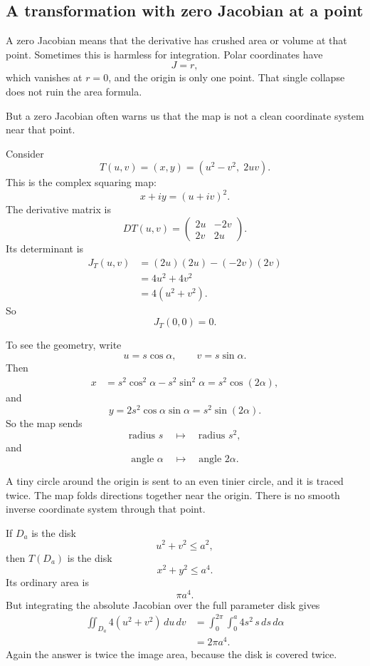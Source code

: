 \subsection{A transformation with zero Jacobian at a point}

A zero Jacobian means that the derivative has crushed area or volume at that point.
Sometimes this is harmless for integration.  Polar coordinates have
\[
    J=r,
\]
which vanishes at \(r=0\), and the origin is only one point.  That single collapse does
not ruin the area formula.

But a zero Jacobian often warns us that the map is not a clean coordinate system near
that point.

Consider
\[
    T(u,v)=(x,y)=(u^2-v^2,\;2uv).
\]
This is the complex squaring map:
\[
    x+iy=(u+iv)^2.
\]
The derivative matrix is
\[
    DT(u,v)=
    \begin{pmatrix}
        2u&-2v\\
        2v&2u
    \end{pmatrix}.
\]
Its determinant is
\[
\begin{aligned}
    J_T(u,v)
    &=
    (2u)(2u)-(-2v)(2v)\\
    &=
    4u^2+4v^2\\
    &=
    4(u^2+v^2).
\end{aligned}
\]
So
\[
    J_T(0,0)=0.
\]

To see the geometry, write
\[
    u=s\cos\alpha,
    \qquad
    v=s\sin\alpha.
\]
Then
\[
\begin{aligned}
    x
    &=
    s^2\cos^2\alpha-s^2\sin^2\alpha
    =
    s^2\cos(2\alpha),
\end{aligned}
\]
and
\[
    y
    =
    2s^2\cos\alpha\sin\alpha
    =
    s^2\sin(2\alpha).
\]
So the map sends
\[
    \text{radius }s \quad\longmapsto\quad \text{radius }s^2,
\]
and
\[
    \text{angle }\alpha \quad\longmapsto\quad \text{angle }2\alpha.
\]

A tiny circle around the origin is sent to an even tinier circle, and it is traced twice.
The map folds directions together near the origin.  There is no smooth inverse
coordinate system through that point.

If \(D_a\) is the disk
\[
    u^2+v^2\le a^2,
\]
then \(T(D_a)\) is the disk
\[
    x^2+y^2\le a^4.
\]
Its ordinary area is
\[
    \pi a^4.
\]
But integrating the absolute Jacobian over the full parameter disk gives
\[
\begin{aligned}
    \iint_{D_a}4(u^2+v^2)\,du\,dv
    &=
    \int_0^{2\pi}\int_0^a 4s^2\,s\,ds\,d\alpha\\
    &=
    2\pi a^4.
\end{aligned}
\]
Again the answer is twice the image area, because the disk is covered twice.

